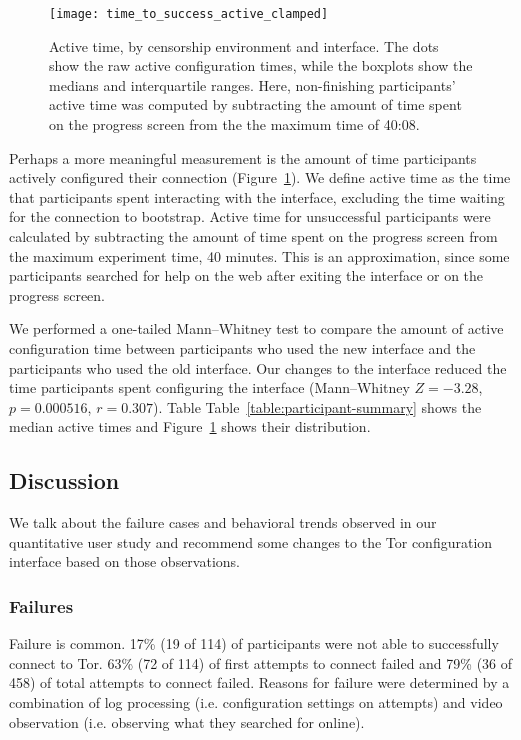 \documentclass[USenglish,oneside,twocolumn]{article}
\begin{document}
\begin{figure}[t]
\centering
\texttt{[image: time\_to\_success\_active\_clamped]}
\caption{
Active time, by censorship environment and interface.
The dots show the raw active configuration times,
while the boxplots show the medians and interquartile ranges.
Here, non-finishing participants' active time was computed by
subtracting the amount of time spent on the progress screen from the 
the maximum time of 40:08.
}
\label{fig:time_to_success_active_clamped}
\end{figure}

Perhaps a more meaningful measurement is the amount of time participants actively configured their connection (Figure~\ref{fig:time_to_success_active_clamped}). We define active time as the time that participants spent interacting with the interface, excluding the time waiting for the connection to bootstrap. Active time for unsuccessful participants were calculated by subtracting the amount of time spent on the progress screen from the maximum experiment time, 40 minutes. This is an approximation, since some participants searched for help on the web after exiting the interface or on the progress screen. 

We performed a one-tailed Mann--Whitney test to compare the amount of active configuration time between participants who used the new interface and the participants who used the old interface. Our changes to the interface reduced the time participants spent configuring the interface (Mann--Whitney $Z = -3.28$, $p = 0.000516$, $r = 0.307$). Table Table~\ref{table:participant-summary} shows the median active times and Figure~\ref{fig:time_to_success_active_clamped} shows their distribution.


\subsection{Discussion} 
We talk about the failure cases and behavioral trends observed in our quantitative user study and recommend some changes to the Tor configuration interface based on those observations. 

\subsubsection{Failures}
Failure is common. 17\% (19 of 114) of participants were not able to successfully connect to Tor. 63\% (72 of 114) of first attempts to connect failed and 79\% (36 of 458) of total attempts to connect failed. Reasons for failure were determined by a combination of log processing (i.e. configuration settings on attempts) and video observation (i.e. observing what they searched for online). \\ 
\end{document}
